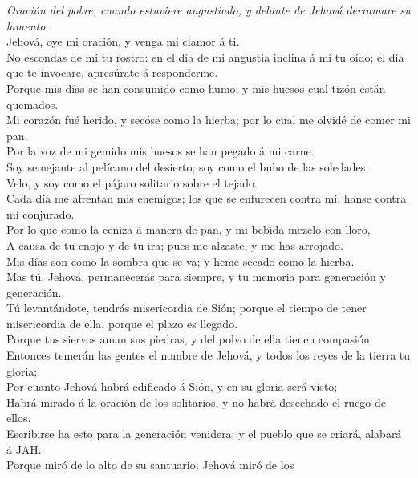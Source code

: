  \emph{Oración del pobre, cuando estuviere angustiado, y
delante de Jehová derramare su lamento.}\\
Jehová, oye mi oración, y venga mi clamor á ti.\\
 No escondas de mí tu rostro: en el día de mi angustia
inclina á mí tu oído; el día que te invocare, apresúrate á
responderme.\\
 Porque mis días se han consumido como humo; y mis huesos
cual tizón están quemados.\\
 Mi corazón fué herido, y secóse como la hierba; por lo cual
me olvidé de comer mi pan.\\
 Por la voz de mi gemido mis huesos se han pegado á mi
carne.\\
 Soy semejante al pelícano del desierto; soy como el buho de
las soledades.\\
 Velo, y soy como el pájaro solitario sobre el tejado.\\
 Cada día me afrentan mis enemigos; los que se enfurecen
contra mí, hanse contra mí conjurado.\\
 Por lo que como la ceniza á manera de pan, y mi bebida
mezclo con lloro,\\
 A causa de tu enojo y de tu ira; pues me alzaste, y me has
arrojado.\\
 Mis días son como la sombra que se va; y heme secado como
la hierba.\\
 Mas tú, Jehová, permanecerás para siempre, y tu memoria
para generación y generación.\\
 Tú levantándote, tendrás misericordia de Sión; porque el
tiempo de tener misericordia de ella, porque el plazo es llegado.\\
 Porque tus siervos aman sus piedras, y del polvo de ella
tienen compasión.\\
 Entonces temerán las gentes el nombre de Jehová, y todos
los reyes de la tierra tu gloria;\\
 Por cuanto Jehová habrá edificado á Sión, y en su gloria
será visto;\\
 Habrá mirado á la oración de los solitarios, y no habrá
desechado el ruego de ellos.\\
 Escribirse ha esto para la generación venidera: y el
pueblo que se criará, alabará á JAH.\\
 Porque miró de lo alto de su santuario; Jehová miró de los
